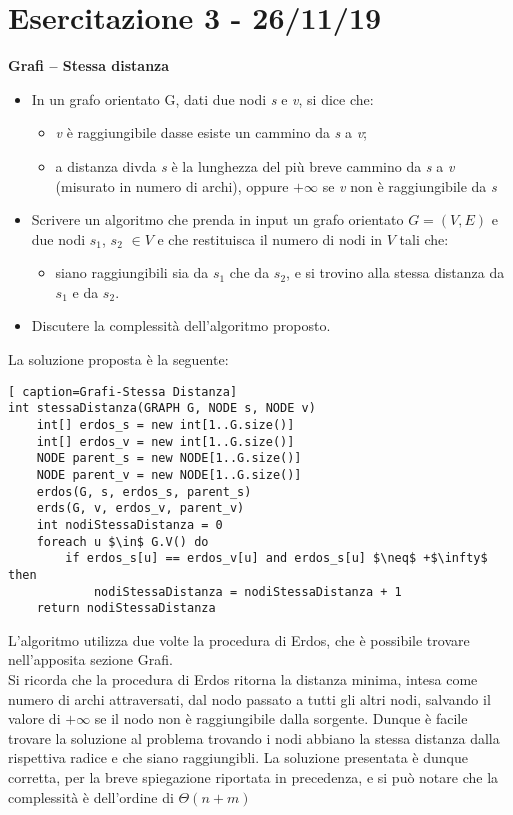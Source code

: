 \documentclass[../cheatSheetAlgoritmi.tex]{subfiles}
\begin{document}
\section{Esercitazione 3 - 26/11/19}
\textbf{Grafi – Stessa distanza}

\begin{itemize}
\item In un grafo orientato G, dati due nodi \textit{s} e \textit{v}, si dice che:
	\begin{itemize}
		\item \textit{v} è raggiungibile dasse esiste un cammino da \textit{s} a \textit{v};
		\item a distanza divda \textit{s} è la lunghezza del più breve cammino da \textit{s} a \textit{v} (misurato in numero di archi), oppure $+\infty$ se \textit{v} non è raggiungibile da \textit{s}
	\end{itemize}
	
	\item Scrivere un algoritmo che prenda in input un grafo orientato $G=(V, E)$ e due nodi $s_1$, $s_2$ $\in V$ e che restituisca il numero di nodi in $V$ tali che:
	\begin{itemize}
		\item siano raggiungibili sia da $s_1$ che da $s_2$, e si trovino alla stessa distanza da $s_1$ e da $s_2$.
	\end{itemize}
	\item Discutere la complessità dell’algoritmo proposto.
\end{itemize}
La soluzione proposta è la seguente:
\begin{lstlisting}[ caption=Grafi-Stessa Distanza]
int stessaDistanza(GRAPH G, NODE s, NODE v)
	int[] erdos_s = new int[1..G.size()]
  	int[] erdos_v = new int[1..G.size()]
  	NODE parent_s = new NODE[1..G.size()]
 	NODE parent_v = new NODE[1..G.size()]
 	erdos(G, s, erdos_s, parent_s)
 	erds(G, v, erdos_v, parent_v)
  	int nodiStessaDistanza = 0
  	foreach u $\in$ G.V() do
    	if erdos_s[u] == erdos_v[u] and erdos_s[u] $\neq$ +$\infty$ then
      		nodiStessaDistanza = nodiStessaDistanza + 1
  	return nodiStessaDistanza
\end{lstlisting}
L'algoritmo utilizza due volte la procedura di Erdos, che è possibile trovare nell'apposita sezione Grafi. \\ Si ricorda che la procedura di Erdos ritorna la distanza minima, intesa come numero di archi attraversati, dal nodo passato a tutti gli altri nodi, salvando il valore di $+\infty$ se il nodo non è raggiungibile dalla sorgente. Dunque è facile trovare la soluzione al problema trovando i nodi abbiano la stessa distanza dalla rispettiva radice e che siano raggiungibli.
La soluzione presentata è dunque corretta, per la breve spiegazione riportata in precedenza, e si può notare che la complessità è dell'ordine di $\Theta(n + m)$ 
 
\end{document}

